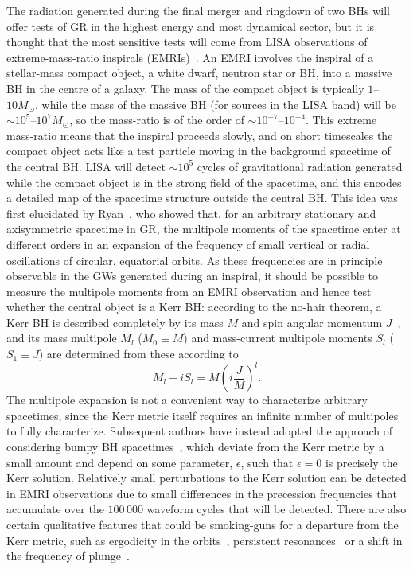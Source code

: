 \documentclass[aps,prd,amsfonts,amssymb,amsmath,nofootinbib,reprint,showpacs]{revtex4-1}
\begin{document}
The radiation generated during the final merger and ringdown of two BHs will offer tests of GR in the highest energy and most dynamical sector, but it is thought that the most sensitive tests will come from LISA observations of extreme-mass-ratio inspirals (EMRIs)~\cite{Amaro-Seoane2007}. An EMRI involves the inspiral of a stellar-mass compact object, a white dwarf, neutron star or BH, into a massive BH in the centre of a galaxy. The mass of the compact object is typically $1$--$10M_{\odot}$, while the mass of the massive BH (for sources in the LISA band) will be $\sim10^5$--$10^7 M_\odot$, so the mass-ratio is of the order of $\sim10^{-7}$--$10^{-4}$. This extreme mass-ratio means that the inspiral proceeds slowly, and on short timescales the compact object acts like a test particle moving in the background spacetime of the central BH. LISA will detect $\sim10^5$ cycles of gravitational radiation generated while the compact object is in the strong field of the spacetime, and this encodes a detailed map of the spacetime structure outside the central BH. This idea was first elucidated by Ryan~\cite{Ryan1995c, Ryan1997a}, who showed that, for an arbitrary stationary and axisymmetric spacetime in GR, the multipole moments of the spacetime enter at different orders in an expansion of the frequency of small vertical or radial oscillations of circular, equatorial orbits. As these frequencies are in principle observable in the GWs generated during an inspiral, it should be possible to measure the multipole moments from an EMRI observation and hence test whether the central object is a Kerr BH: according to the no-hair theorem, a Kerr BH is described completely by its mass $M$ and spin angular momentum $J$~\cite{Israel1967, Israel1968, Carter1971, Hawking1972, Robinson1975}, and its mass multipole $M_l$ ($M_0 \equiv M$) and mass-current multipole moments $S_l$ ($S_1 \equiv J$) are determined from these according to~\cite{Hansen1974}
\begin{equation}
M_l + iS_l = M \left(i\frac{J}{M}\right)^l .
\end{equation}
The multipole expansion is not a convenient way to characterize arbitrary spacetimes, since the Kerr metric itself requires an infinite number of multipoles to fully characterize. Subsequent authors have instead adopted the approach of considering bumpy BH spacetimes~\cite{Collins2004, Glampedakis2006a, Barack2007, Gair2008a}, which deviate from the Kerr metric by a small amount and depend on some parameter, $\epsilon$, such that $\epsilon = 0$ is precisely the Kerr solution. Relatively small perturbations to the Kerr solution can be detected in EMRI observations due to small differences in the precession frequencies that accumulate over the $100\,000$ waveform cycles that will be detected. There are also certain qualitative features that could be smoking-guns for a departure from the Kerr metric, such as ergodicity in the orbits~\cite{Gair2008a}, persistent resonances~\cite{Lukes-Gerakopoulos2010} or a shift in the frequency of plunge~\cite{Kesden2005, Gair2008a}.
\end{document}

